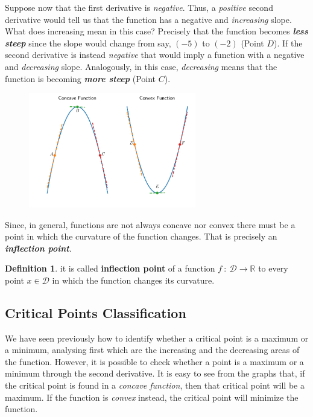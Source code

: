 \documentclass[a4paper,11pt]{article}
\theoremstyle{definition}
\newtheorem{definition}{Definition}
\theoremstyle{plain}
\begin{document}
Suppose now that the first derivative is \emph{negative}. Thus, a
\emph{positive} second derivative would tell us that the function has a
negative and \emph{increasing} slope. What does increasing mean in this
case? Precisely that the function becomes \textbf{\emph{less steep}}
since the slope would change from say, \((-5)\) to \((-2)\) (Point
\(D\)). If the second derivative is instead \emph{negative} that would
imply a function with a negative and \emph{decreasing} slope.
Analogously, in this case, \emph{decreasing} means that the function is
becoming \textbf{\emph{more steep}} (Point \(C\)).

    \begin{figure}[htbp]
    	\centering 
    		\includegraphics[width = 0.65\textwidth]{Ch2_files/Ch2_27_0.pdf}
    \end{figure}
    
    Since, in general, functions are not always concave nor convex there
must be a point in which the curvature of the function changes. That is
precisely an \textbf{\emph{inflection point}}.

\begin{definition}
it is called \textbf{inflection point} of a
function \(f \: : \: \mathcal{D}\rightarrow\mathbb{R}\) to every point
\(x\in\mathcal{D}\) in which the function changes its curvature.
\end{definition}

\subsection{Critical Points
Classification}\label{critical-points-classification}

We have seen previously how to identify whether a critical point is a
maximum or a minimum, analysing first which are the increasing and the
decreasing areas of the function. However, it is possible to check
whether a point is a maximum or a minimum through the second derivative.
It is easy to see from the graphs that, if the critical point is found
in a \emph{concave function}, then that critical point will be a
maximum. If the function is \emph{convex} instead, the critical point
will minimize the function.
\end{document}
